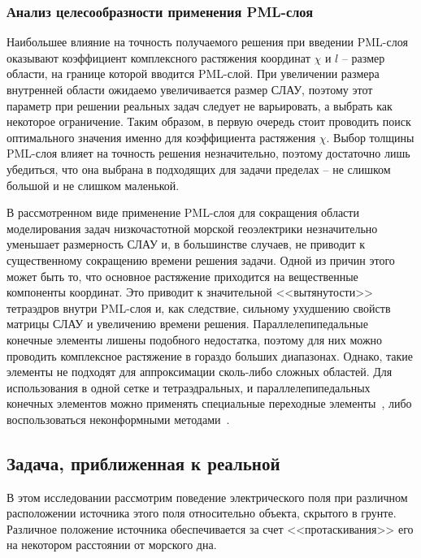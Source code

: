 \documentclass[a4paper,14pt]{article}
\begin{document}

\subsubsection{Анализ целесообразности применения PML-слоя}
Наибольшее влияние на точность получаемого решения при введении PML-слоя оказывают коэффициент комплексного растяжения координат $\chi$ и $l$ -- размер области, на границе которой вводится PML-слой. При увеличении размера внутренней области ожидаемо увеличивается размер СЛАУ, поэтому этот параметр при решении реальных задач следует не варьировать, а выбрать как некоторое ограничение. Таким образом, в первую очередь стоит проводить поиск оптимального значения именно для коэффициента растяжения $\chi$. Выбор толщины PML-слоя влияет на точность решения незначительно, поэтому достаточно лишь убедиться, что она выбрана в подходящих для задачи пределах -- не слишком большой и не слишком маленькой.

В рассмотренном виде применение PML-слоя для сокращения области моделирования задач низкочастотной морской геоэлектрики незначительно уменьшает размерность СЛАУ и, в большинстве случаев, не приводит к существенному сокращению времени решения задачи. Одной из причин этого может быть то, что основное растяжение приходится на вещественные компоненты координат. Это приводит к значительной <<вытянутости>> тетраэдров внутри PML-слоя и, как следствие, сильному ухудшению свойств матрицы СЛАУ и увеличению времени решения. Параллелепипедальные конечные элементы лишены подобного недостатка, поэтому для них можно проводить комплексное растяжение в гораздо больших диапазонах. Однако, такие элементы не подходят для аппроксимации сколь-либо сложных областей. Для использования в одной сетке и тетраэдральных, и параллелепипедальных конечных элементов можно применять специальные переходные элементы~\citep{extra_elements1,extra_elements2}, либо воспользоваться неконформными методами~\citep{dg1,dg2,dg3,mortar1,mortar2}.


\subsection{Задача, приближенная к реальной}
В этом исследовании рассмотрим поведение электрического поля при различном расположении источника этого поля относительно объекта, скрытого в грунте. Различное положение источника обеспечивается за счет <<протаскивания>> его на некотором расстоянии от морского дна.
\end{document}
